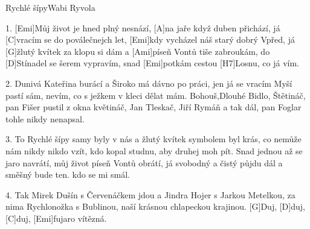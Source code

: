 \begin{song}{Rychlé šípy}{Wabi Ryvola}

\begin{xverse}{1. }
[Emi]Můj život je hned plný nesnází,
[A]na jaře když duben přichází,
já [C]vracím se do poválečnejch let,
[Emi]kdy vycházel náš starý dobrý Vpřed,
já [G]{žlu}tý kvítek za klopu si dám
a [Ami]píseň Vontů tiše zabroukám,
do [D]Stínadel se šerem vypravím,
snad [Emi]potkám cestou [H7]Losnu, co já vím.
\end{xverse}


\begin{xverse}{2. }
Dunivá Kateřina burácí
a Široko má dávno po práci,
jen já se vracím Myší pastí sám,
nevím, co s ježkem v kleci dělat mám.
Bohouš,Dlouhé Bidlo, Štětináč,
pan Fišer pustil z okna květináč,
Jan Tleskač, Jiří Rymáň a tak dál,
pan Foglar tohle nikdy nenapsal.
\end{xverse}


\begin{xverse}{3. }
To Rychlé šípy samy byly v nás
a žlutý kvítek symbolem byl krás,
co nemůže nám nikdy nikdo vzít,
kdo kopal studnu, aby druhej moh pít.
Snad jednou až se jaro navrátí,
můj život píseň Vontů obrátí,
já svobodný a čistý půjdu dál
a směšný bude ten. kdo se mi smál.
\end{xverse}


\begin{xverse}{4. }
Tak Mirek Dušín s Červenáčkem jdou
a Jindra Hojer s Jarkou Metelkou,
za nima Rychlonožka s Bublinou,
naší krásnou chlapeckou krajinou.
[G]Duj, [D]duj, [C]duj, [Emi]fujaro vítězná.
\end{xverse}
\end{song}


